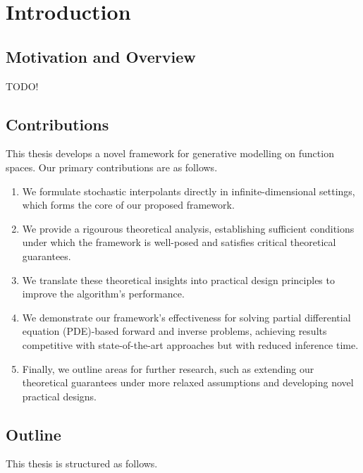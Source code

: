 
\chapter{Introduction} \label{cha:1}  %

\ifpdf
\graphicspath{{Chapter1/Figs/Raster/}{Chapter1/Figs/PDF/}{Chapter1/Figs/}}
\else
\graphicspath{{Chapter1/Figs/Vector/}{Chapter1/Figs/}}
\fi

\section{Motivation and Overview}
TODO!

\section{Contributions}
This thesis develops a novel framework for generative modelling on function spaces. Our primary contributions are as follows.
\begin{enumerate}
  \item We formulate stochastic interpolants directly in infinite-dimensional settings, which forms the core of our proposed framework.
  \item We provide a rigourous theoretical analysis, establishing sufficient conditions under which the framework is well-posed and satisfies critical theoretical guarantees.
  \item We translate these theoretical insights into practical design principles to improve the algorithm's performance.
  \item We demonstrate our framework's effectiveness for solving partial differential equation (PDE)-based forward and inverse problems, achieving results competitive with state-of-the-art approaches but with reduced inference time.
  \item Finally, we outline areas for further research, such as extending our theoretical guarantees under more relaxed assumptions  and developing novel practical designs.
\end{enumerate}

\section{Outline}
This thesis is structured as follows.


